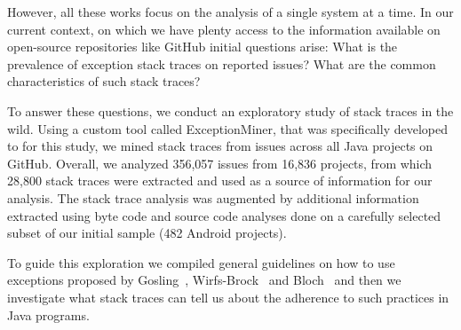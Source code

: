 \documentclass[conference]{IEEEtran}
\begin{document}
However, all these works focus on the analysis of a single system at a time. In
our current context, on which we have plenty access to the information available
on open-source repositories like GitHub initial questions arise: What is the
prevalence of exception stack traces on reported issues? What are the common
characteristics of such stack traces?



To answer these questions, we conduct an exploratory study of stack traces in
the wild. Using a custom tool called ExceptionMiner, that was specifically
developed to for this study, we mined stack traces from issues across all Java
projects on GitHub. Overall, we analyzed 356,057 issues from 16,836 projects,
from which 28,800 stack traces were extracted and used as a source of
information for our analysis. The stack trace analysis  was augmented by
additional information extracted using byte code and source code analyses done
on a carefully selected subset of our initial sample (482 Android projects).

To guide this exploration we compiled general guidelines on how to use
exceptions proposed by Gosling~\cite{gosling2000java},
Wirfs-Brock~\cite{wirfs2006toward} and Bloch~\cite{bloch2008effective} and then
we investigate what stack traces can tell us about the adherence to such
practices in Java programs.


\end{document}
